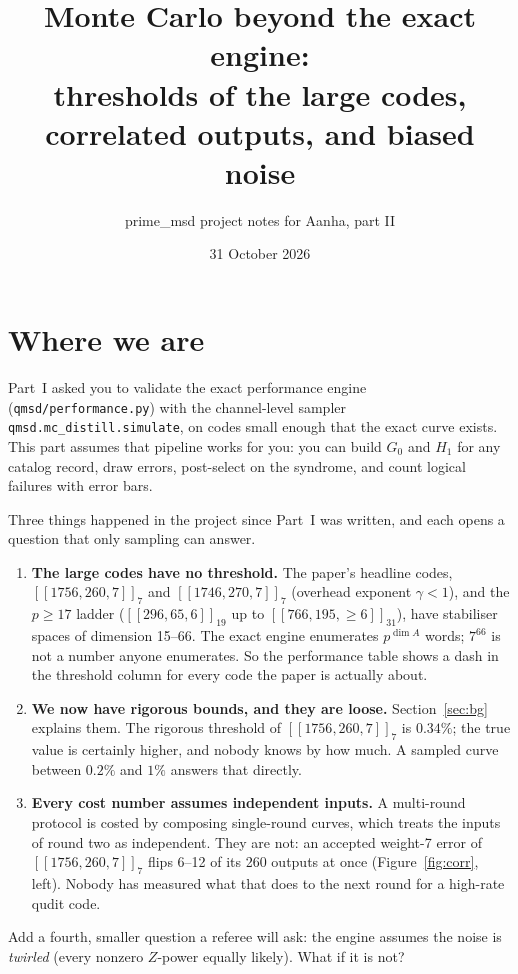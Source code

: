 \documentclass[11pt]{article}
\title{Monte Carlo beyond the exact engine:\\ thresholds of the large codes, correlated outputs, and biased noise}
\author{prime\_msd project notes for Aanha, part II}
\date{31 October 2026}
\newcommand{\code}[1]{\texttt{#1}}
\begin{document}
\maketitle
\tableofcontents

\section{Where we are}

Part~I asked you to validate the exact performance engine (\code{qmsd/performance.py})
with the channel-level sampler \code{qmsd.mc\_distill.simulate}, on codes small enough
that the exact curve exists. This part assumes that pipeline works for you: you can
build $G_0$ and $H_1$ for any catalog record, draw errors, post-select on the
syndrome, and count logical failures with error bars.

Three things happened in the project since Part~I was written, and each opens a
question that only sampling can answer.

\begin{enumerate}[nosep]
\item \textbf{The large codes have no threshold.} The paper's headline codes,
  $[[1756,260,7]]_7$ and $[[1746,270,7]]_7$ (overhead exponent $\gamma<1$), and the
  $p\ge 17$ ladder ($[[296,65,6]]_{19}$ up to $[[766,195,{\ge}6]]_{31}$), have
  stabiliser spaces of dimension 15--66. The exact engine enumerates $p^{\dim A}$
  words; $7^{66}$ is not a number anyone enumerates. So the performance table shows a
  dash in the threshold column for every code the paper is actually about.
\item \textbf{We now have rigorous bounds, and they are loose.} Section~\ref{sec:bg}
  explains them. The rigorous threshold of $[[1756,260,7]]_7$ is $0.34\%$; the true
  value is certainly higher, and nobody knows by how much. A sampled curve between
  $0.2\%$ and $1\%$ answers that directly.
\item \textbf{Every cost number assumes independent inputs.} A multi-round protocol
  is costed by composing single-round curves, which treats the inputs of round two as
  independent. They are not: an accepted weight-7 error of $[[1756,260,7]]_7$ flips
  6--12 of its 260 outputs at once (Figure~\ref{fig:corr}, left). Nobody has measured
  what that does to the next round for a high-rate qudit code.
\end{enumerate}

Add a fourth, smaller question a referee will ask: the engine assumes the noise is
\emph{twirled} (every nonzero $Z$-power equally likely). What if it is not?
\end{document}
